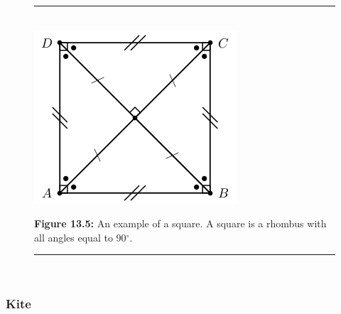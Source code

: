 	\begin{figure}[H] %
    \begin{center}
    \rule[.1in]{\figurerulewidth}{.005in} \\
        \label{m39354*uid84!!!underscore!!!media}\label{m39354*uid84!!!underscore!!!printright prismsimage}\includegraphics{col11306.imgs/m39354_MG10C13_044.png} %
        
      \vspace{2pt}
    \vspace{\rubberspace}\par \begin{cnxcaption}
	  \small \textbf{Figure 13.5: }An example of a square. A square is a rhombus with all angles equal to 90\begin{math}{}^{\circ }\end{math}.
	\end{cnxcaption}
      
    \vspace{.1in}
    \rule[.1in]{\figurerulewidth}{.005in} \\
        
    \end{center}

 \end{figure}   

    \addtocounter{footnote}{-0}
    
        
        \label{m39354*uid85}
            \subsubsection{ Kite}
            \nopagebreak
            
